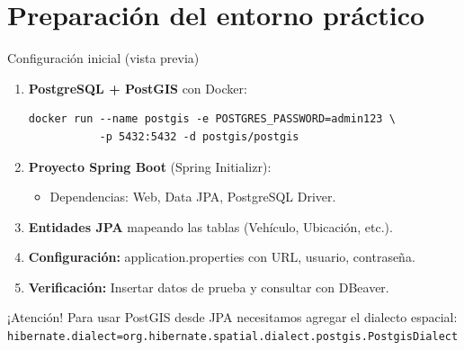 \documentclass[10pt, aspectratio=169]{beamer}
\begin{document}
\section{Preparación del entorno práctico}
\begin{frame}[fragile]{Configuración inicial (vista previa)}
    \begin{enumerate}
        \item \textbf{PostgreSQL + PostGIS} con Docker:
        \begin{lstlisting}[basicstyle=\ttfamily\small]
docker run --name postgis -e POSTGRES_PASSWORD=admin123 \
           -p 5432:5432 -d postgis/postgis
        \end{lstlisting}
        \item \textbf{Proyecto Spring Boot} (Spring Initializr):
        \begin{itemize}
            \item Dependencias: Web, Data JPA, PostgreSQL Driver.
        \end{itemize}
        \item \textbf{Entidades JPA} mapeando las tablas (Vehículo, Ubicación, etc.).
        \item \textbf{Configuración:} application.properties con URL, usuario, contraseña.
        \item \textbf{Verificación:} Insertar datos de prueba y consultar con DBeaver.
    \end{enumerate}
    \begin{alertblock}{¡Atención!}
        Para usar PostGIS desde JPA necesitamos agregar el dialecto espacial:
        \texttt{hibernate.dialect=org.hibernate.spatial.dialect.postgis.PostgisDialect}
    \end{alertblock}
\end{frame}
\end{document}
